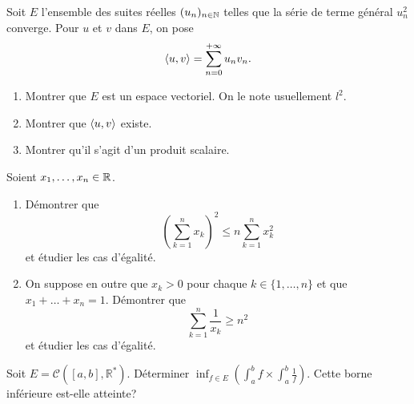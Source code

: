 \documentclass{book}
\begin{document}
 \begin{Exercice}[*]
Soit $E$ l'ensemble des suites réelles $(u_n)_{n\in\mathbb{N}}$ telles que la série de terme général $u_n^2$ converge.
Pour $u$ et $v$ dans $E$, on pose
\[ \langle u,v\rangle = \sum_{n=0}^{+\infty} u_n v_n. \]
\begin{enumerate}
\item Montrer que $E$ est un espace vectoriel. On le note usuellement $l^2$.
\item Montrer que $\langle u,v\rangle$ existe.
\item Montrer qu'il s'agit d'un produit scalaire.
\end{enumerate}
\end{Exercice}
 \begin{Exercice}

Soient $x_1,\dots,x_n\in\mathbb{R}$.
\begin{enumerate}
\item Démontrer que 
$$\left(\sum_{k=1}^n x_k\right)^2\leq n\sum_{k=1}^n x_k^2$$
et étudier les cas d'égalité.
\item On suppose en outre que $x_k>0$ pour chaque $k\in\{1,\dots,n\}$ et que $x_1+\dots+x_n=1$.
Démontrer que 
$$\sum_{k=1}^n \frac 1{x_k}\geq n^2$$
et étudier les cas d'égalité.
\end{enumerate}
\end{Exercice}

\begin{Exercice}
Soit $E=\mathcal C([a,b],\mathbb R^*)$. Déterminer $\inf_{f\in E}\left(\int_a^b f\times \int_a^b \frac 1f\right)$. Cette borne inférieure est-elle atteinte?
\end{Exercice}
\end{document}
